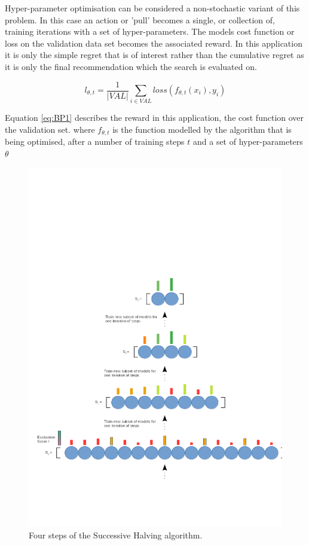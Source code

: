 	\par

	Hyper-parameter optimisation can be considered a non-stochastic variant of this problem. In this case an action or 'pull' becomes a single, or collection of, training iterations with a set of hyper-parameters. The models cost function or loss on the validation data set becomes the associated reward.  In this application it is only the simple regret that is of interest rather than the cumulative regret as it is only the final recommendation which the search is evaluated on.


		\begin{equation}\label{eq:BP1}	l_{\theta,t} = \frac{1}{|VAL|} \sum_{i \in VAL} loss(f_{\theta,t}(x_i),y_i)\end{equation}



	Equation \ref{eq:BP1} describes the reward in this application, the cost function over the validation set. where \(f_{\theta,t}\) is the function modelled by the algorithm that is being optimised, after a number of training steps \(t\) and a set of hyper-parameters \(\theta\)


			\begin{figure}[h]
			
			\centering 
			\includegraphics[trim= 100 100 100 300 ,scale=0.45]{bandit.png}


			\caption{Four steps of the Successive Halving algorithm. }
			\label{fig:BP1}


			\end{figure}



